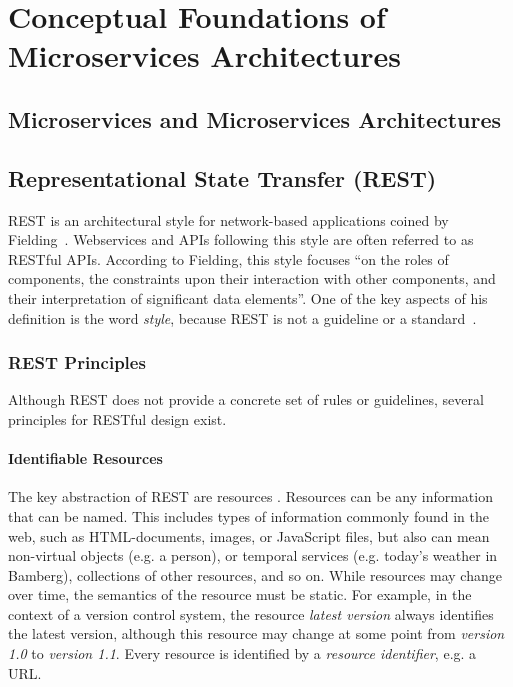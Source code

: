 \section{Conceptual Foundations of Microservices Architectures}\label{sec:foundations}

\subsection{Microservices and Microservices Architectures}

\subsection{Representational State Transfer (\acs{REST})}

\ac{REST} is an architectural style for network-based applications coined by Fielding~\cite{Fielding2000}.
Webservices and \acp{API} following this style are often referred to as \acs{REST}ful \acp{API}.
According to Fielding, this style focuses ``on the roles of components, the constraints upon their interaction with other components, and their interpretation of significant data elements''.
One of the key aspects of his definition is the word \textit{style}, because \ac{REST} is not a guideline or a standard~\cite{Malakhov2018}.



\subsubsection{REST Principles}

Although \ac{REST} does not provide a concrete set of rules or guidelines, several principles for \ac{REST}ful design exist.

\paragraph{Identifiable Resources}

The key abstraction of \ac{REST} are resources \cite{Fielding2000,Erenkrantz2007}.
Resources can be any information that can be named.
This includes types of information commonly found in the web, such as \acs{HTML}-documents, images, or JavaScript files, but also can mean non-virtual objects (e.g. a person), or temporal services (e.g. today's weather in Bamberg), collections of other resources, and so on.
While resources may change over time, the semantics of the resource must be static.
For example, in the context of a version control system, the resource \textit{latest version} always identifies the latest version, although this resource may change at some point from \textit{version 1.0} to \textit{version 1.1}.
Every resource is identified by a \textit{resource identifier}, e.g. a \ac{URL}. 

